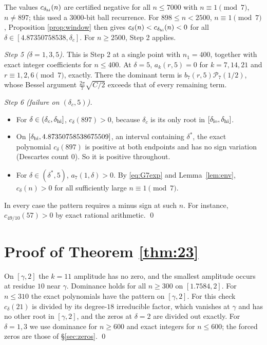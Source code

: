 \documentclass[11pt]{amsart}
\theoremstyle{remark}
\theoremstyle{definition}
\newcommand{\cP}{\mathcal P}
\begin{document}
The values $c_{\delta_{\rm hi}}(n)$ are certified negative for all $n\le7000$ with $n\equiv1\pmod7$, $n\ne897$; this used a $3000$-bit ball recurrence. For $898\le n<2500$, $n\equiv1\pmod7$, Proposition \ref{prop:window} then gives $c_\delta(n)<c_{\delta_{\rm hi}}(n)<0$ for all $\delta\in[4.87350758538,\delta_c]$. For $n\ge2500$, Step 2 applies.

\emph{Step 5 ($\delta=1,3,5$).} This is Step 2 at a single point with $n_1=400$, together with exact integer coefficients for $n\le400$. At $\delta=5$, $a_k(r,5)=0$ for $k=7,14,21$ and $r\equiv1,2,6\pmod7$, exactly. There the dominant term is $b_7(r,5)\cP_7(1/2)$, whose Bessel argument $\frac{2\pi}7\sqrt{C/2}$ exceeds that of every remaining term.

\emph{Step 6 (failure on $(\delta_c,5)$).}
\begin{itemize}[leftmargin=2em]
\item For $\delta\in(\delta_c,\delta_{\rm hi}]$, $c_\delta(897)>0$, because $\delta_c$ is its only root in $[\delta_{\rm lo},\delta_{\rm hi}]$.
\item On $[\delta_{\rm hi},4.87350758538675509]$, an interval containing $\delta^*$, the exact polynomial $c_\delta(897)$ is positive at both endpoints and has no sign variation (Descartes count $0$). So it is positive throughout.
\item For $\delta\in(\delta^*,5)$, $a_7(1,\delta)>0$. By \eqref{eq:G7exp} and Lemma~\ref{lem:env}, $c_\delta(n)>0$ for all sufficiently large $n\equiv1\pmod 7$.
\end{itemize}
In every case the pattern requires a minus sign at such $n$. For instance, $c_{49/10}(57)>0$ by exact rational arithmetic. \qed

\section{Proof of Theorem \ref{thm:23}}\label{sec:23}
On $[\gamma,2]$ the $k=11$ amplitude has no zero, and the smallest amplitude occurs at residue $10$ near $\gamma$. Dominance holds for all $n\ge300$ on $[1.7584,2]$. For $n\le310$ the exact polynomials have the pattern on $[\gamma,2]$. For this check $c_\delta(21)$ is divided by its degree-$18$ irreducible factor, which vanishes at $\gamma$ and has no other root in $[\gamma,2]$, and the zeros at $\delta=2$ are divided out exactly. For $\delta=1,3$ we use dominance for $n\ge600$ and exact integers for $n\le600$; the forced zeros are those of \S\ref{sec:zeros}. \qed
\end{document}
